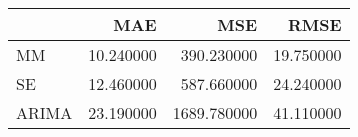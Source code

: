 \begin{tabular}{lrrr}
\toprule
 & MAE & MSE & RMSE \\
\midrule
MM & 10.240000 & 390.230000 & 19.750000 \\
SE & 12.460000 & 587.660000 & 24.240000 \\
ARIMA & 23.190000 & 1689.780000 & 41.110000 \\
\bottomrule
\end{tabular}
